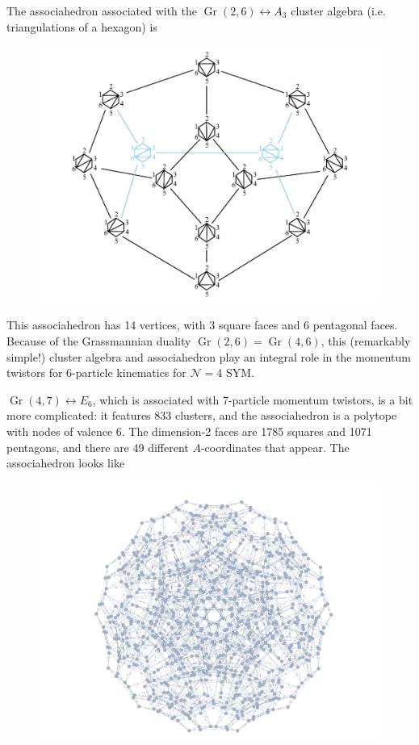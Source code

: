 \documentclass[11pt]{article}
\DeclareMathOperator{\Gr}{Gr}
\begin{document}
The associahedron associated with the $\Gr(2,6) \leftrightarrow A_3$ cluster algebra (i.e. triangulations of a hexagon) is
\begin{figure}[h]
  \centering
  \includegraphics[scale=0.25]{a3-associahedron}
\end{figure}

This associahedron has 14 vertices, with 3 square faces and 6 pentagonal faces. Because of the Grassmannian duality $\Gr(2,6) = \Gr(4,6)$, this (remarkably simple!) cluster algebra and associahedron play an integral role in the momentum twistors for 6-particle kinematics for $\mathcal{N}=4$ SYM. 

$\Gr(4,7) \leftrightarrow E_6$, which is associated with 7-particle momentum twistors, is a bit more complicated: it features 833 clusters, and the associahedron is a polytope with nodes of valence 6. The dimension-2 faces are 1785 squares and 1071 pentagons, and there are 49 different $A$-coordinates that appear. The associahedron looks like
\begin{figure}[h]
  \centering
  \includegraphics[scale=0.25]{e6-associahedron}
\end{figure}
\end{document}
